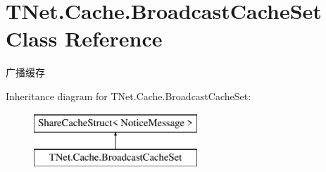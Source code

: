 \hypertarget{class_t_net_1_1_cache_1_1_broadcast_cache_set}{}\section{T\+Net.\+Cache.\+Broadcast\+Cache\+Set Class Reference}
\label{class_t_net_1_1_cache_1_1_broadcast_cache_set}


广播缓存  


Inheritance diagram for T\+Net.\+Cache.\+Broadcast\+Cache\+Set\+:\begin{figure}[H]
\begin{center}
\leavevmode
\includegraphics[height=2.000000cm]{class_t_net_1_1_cache_1_1_broadcast_cache_set}
\end{center}
\end{figure}
